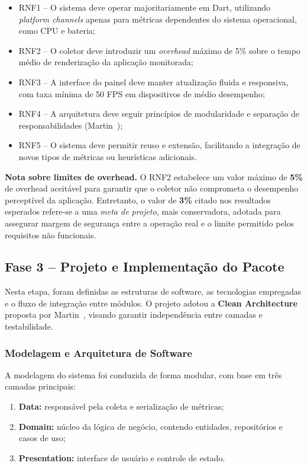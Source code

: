 \begin{itemize}
  \item RNF1 – O sistema deve operar majoritariamente em Dart, utilizando \textit{platform channels} apenas para métricas dependentes do sistema operacional, como CPU e bateria;
  \item RNF2 – O coletor deve introduzir um \textit{overhead} máximo de 5\% sobre o tempo médio de renderização da aplicação monitorada;
  \item RNF3 – A interface do painel deve manter atualização fluida e responsiva, com taxa mínima de 50 FPS em dispositivos de médio desempenho;
  \item RNF4 – A arquitetura deve seguir princípios de modularidade e separação de responsabilidades (Martin~\cite{martin2018clean});
  \item RNF5 – O sistema deve permitir reuso e extensão, facilitando a integração de novos tipos de métricas ou heurísticas adicionais.
\end{itemize}

\noindent\textbf{Nota sobre limites de overhead.}
O RNF2 estabelece um valor máximo de \textbf{5\%} de overhead aceitável
para garantir que o coletor não comprometa o desempenho perceptível da
aplicação. Entretanto, o valor de \textbf{3\%} citado nos resultados esperados
refere-se a uma \textit{meta de projeto}, mais conservadora, adotada
para assegurar margem de segurança entre a operação real e o limite
permitido pelos requisitos não funcionais.

\subsection{Fase 3 – Projeto e Implementação do Pacote}

Nesta etapa, foram definidas as estruturas de software, as tecnologias empregadas e o fluxo de integração entre módulos. O projeto adotou a \textbf{Clean Architecture} proposta por Martin~\cite{martin2018clean}, visando garantir independência entre camadas e testabilidade.



\subsubsection{Modelagem e Arquitetura de Software}

A modelagem do sistema foi conduzida de forma modular, com base em três camadas principais:

\begin{enumerate}
  \item \textbf{Data:} responsável pela coleta e serialização de métricas;
  \item \textbf{Domain:} núcleo da lógica de negócio, contendo entidades, repositórios e casos de uso;
  \item \textbf{Presentation:} interface de usuário e controle de estado.
\end{enumerate}

